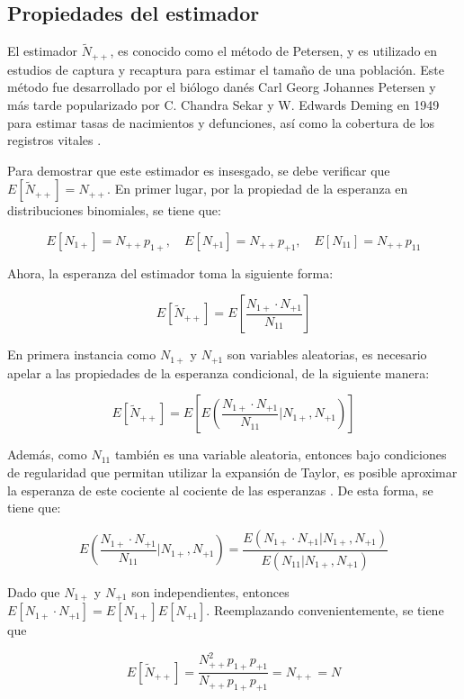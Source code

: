 \documentclass[
  12pt,
]{book}
\begin{document}
\hypertarget{propiedades-del-estimador}{%
\subsection{Propiedades del estimador}\label{propiedades-del-estimador}}

El estimador \(\tilde{N}_{++}\), es conocido como el método de Petersen, y es utilizado en estudios de captura y recaptura para estimar el tamaño de una población. Este método fue desarrollado por el biólogo danés Carl Georg Johannes Petersen \citep{petersen1896} y más tarde popularizado por C. Chandra Sekar y W. Edwards Deming en 1949 para estimar tasas de nacimientos y defunciones, así como la cobertura de los registros vitales \citep{sekar1949}.

Para demostrar que este estimador es insesgado, se debe verificar que \(E[\tilde{N}_{++}] = N_{++}\). En primer lugar, por la propiedad de la esperanza en distribuciones binomiales, se tiene que:

\[
E[N_{1+}] = N_{++} p_{1+}, \quad E[N_{+1}] = N_{++} p_{+1}, \quad E[N_{11}] = N_{++} p_{11}
\]

Ahora, la esperanza del estimador toma la siguiente forma:

\[
E[\tilde{N}_{++}] = E\left[ \frac{N_{1+} \cdot N_{+1}}{N_{11}} \right]
\]

En primera instancia como \(N_{1+}\) y \(N_{+1}\) son variables aleatorias, es necesario apelar a las propiedades de la esperanza condicional, de la siguiente manera:

\[
E[\tilde{N}_{++}] = E \left[ E \left( \frac{N_{1+} \cdot N_{+1}}{N_{11}} \Bigg| N_{1+}, N_{+1} \right) \right]
\]

Además, como \(N_{11}\) también es una variable aleatoria, entonces bajo condiciones de regularidad que permitan utilizar la expansión de Taylor, es posible aproximar la esperanza de este cociente al cociente de las esperanzas \citep{casella2002statistical}. De esta forma, se tiene que:

\[
E \left( \frac{N_{1+} \cdot N_{+1}}{N_{11}} \Bigg| N_{1+}, N_{+1} \right) =  \frac{E (N_{1+} \cdot N_{+1}| N_{1+}, N_{+1} )}{E (N_{11}| N_{1+}, N_{+1} )} 
\]

Dado que \(N_{1+}\) y \(N_{+1}\) son independientes, entonces \(E[N_{1+} \cdot N_{+1}] = E[N_{1+}] E[N_{+1}]\). Reemplazando convenientemente, se tiene que

\[
E[\tilde{N}_{++}] = \frac{N_{++}^2 p_{1+} p_{+1}}{N_{++} p_{1+} p_{+1}} 
= N_{++} = N
\]
\end{document}
